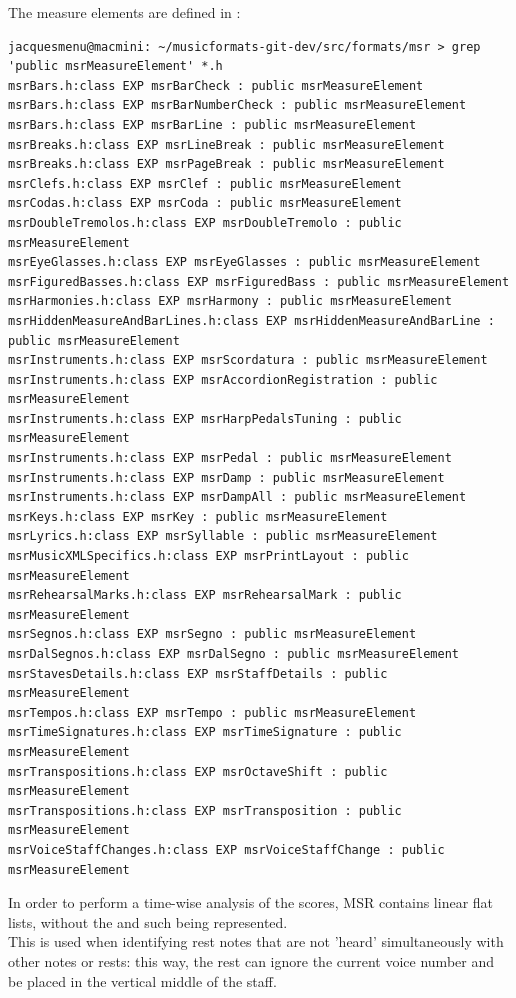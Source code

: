 The measure elements are defined in \msr{}:
\begin{lstlisting}[language=Terminal]
jacquesmenu@macmini: ~/musicformats-git-dev/src/formats/msr > grep  'public msrMeasureElement' *.h
msrBars.h:class EXP msrBarCheck : public msrMeasureElement
msrBars.h:class EXP msrBarNumberCheck : public msrMeasureElement
msrBars.h:class EXP msrBarLine : public msrMeasureElement
msrBreaks.h:class EXP msrLineBreak : public msrMeasureElement
msrBreaks.h:class EXP msrPageBreak : public msrMeasureElement
msrClefs.h:class EXP msrClef : public msrMeasureElement
msrCodas.h:class EXP msrCoda : public msrMeasureElement
msrDoubleTremolos.h:class EXP msrDoubleTremolo : public msrMeasureElement
msrEyeGlasses.h:class EXP msrEyeGlasses : public msrMeasureElement
msrFiguredBasses.h:class EXP msrFiguredBass : public msrMeasureElement
msrHarmonies.h:class EXP msrHarmony : public msrMeasureElement
msrHiddenMeasureAndBarLines.h:class EXP msrHiddenMeasureAndBarLine : public msrMeasureElement
msrInstruments.h:class EXP msrScordatura : public msrMeasureElement
msrInstruments.h:class EXP msrAccordionRegistration : public msrMeasureElement
msrInstruments.h:class EXP msrHarpPedalsTuning : public msrMeasureElement
msrInstruments.h:class EXP msrPedal : public msrMeasureElement
msrInstruments.h:class EXP msrDamp : public msrMeasureElement
msrInstruments.h:class EXP msrDampAll : public msrMeasureElement
msrKeys.h:class EXP msrKey : public msrMeasureElement
msrLyrics.h:class EXP msrSyllable : public msrMeasureElement
msrMusicXMLSpecifics.h:class EXP msrPrintLayout : public msrMeasureElement
msrRehearsalMarks.h:class EXP msrRehearsalMark : public msrMeasureElement
msrSegnos.h:class EXP msrSegno : public msrMeasureElement
msrDalSegnos.h:class EXP msrDalSegno : public msrMeasureElement
msrStavesDetails.h:class EXP msrStaffDetails : public msrMeasureElement
msrTempos.h:class EXP msrTempo : public msrMeasureElement
msrTimeSignatures.h:class EXP msrTimeSignature : public msrMeasureElement
msrTranspositions.h:class EXP msrOctaveShift : public msrMeasureElement
msrTranspositions.h:class EXP msrTransposition : public msrMeasureElement
msrVoiceStaffChanges.h:class EXP msrVoiceStaffChange : public msrMeasureElement
\end{lstlisting}


In order to perform a time-wise analysis of the scores, MSR contains  linear flat lists, without the  and such being represented.\\
This is used when identifying rest notes that are not 'heard' simultaneously with other notes or rests: this way, the rest can ignore the current voice number and be placed in the vertical middle of the staff.


